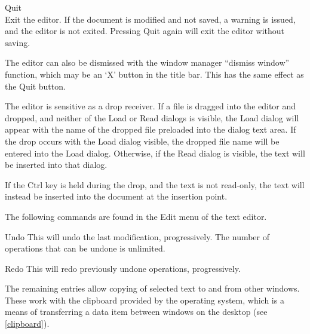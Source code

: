 \begin{description}
\item{\cb Quit}\\
Exit the editor.  If the document is modified and not saved, a warning
is issued, and the editor is not exited.  Pressing {\cb Quit} again
will exit the editor without saving.

The editor can also be dismissed with the window manager ``dismiss
window'' function, which may be an `{\cb X}' button in the title bar. 
This has the same effect as the {\cb Quit} button.
\end{description}

The editor is sensitive as a drop receiver.  If a file is dragged into
the editor and dropped, and neither of the {\cb Load} or {\cb Read}
dialogs is visible, the {\cb Load} dialog will appear with the name of
the dropped file preloaded into the dialog text area.  If the drop
occurs with the {\cb Load} dialog visible, the dropped file name will
be entered into the {\cb Load} dialog.  Otherwise, if the {\cb Read}
dialog is visible, the text will be inserted into that dialog.

If the {\kb Ctrl} key is held during the drop, and the text is not
read-only, the text will instead be inserted into the document at the
insertion point.

The following commands are found in the {\cb Edit} menu of the
text editor.

\begin{description}
\item{\cb Undo}
This will undo the last modification, progressively.  The number of
operations that can be undone is unlimited.

\item{\cb Redo}
This will redo previously undone operations, progressively.
\end{description}

The remaining entries allow copying of selected text to and from other
windows.  These work with the clipboard provided by the operating
system, which is a means of transferring a data item between windows
on the desktop (see \ref{clipboard}).


